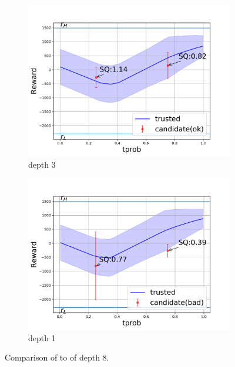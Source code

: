 \begin{figure}[tbp]
    \centering
    \begin{subfigure}[b]{0.5\linewidth}
        \centering
        \includegraphics[width=1.1\linewidth]{Figures/transition_vary_tprob_ok.pdf}
        \vfill
        \caption{\solve{} depth 3}
        \label{fig:tprob_ok}
    \end{subfigure}%
    \hfill
    \begin{subfigure}[b]{0.5\linewidth}
        \centering
        \includegraphics[width=1.1\linewidth]{Figures/transition_vary_tprob_bad.pdf}
        \caption{\solve{} depth 1}
        \label{fig:tprob_bad}
    \end{subfigure} 
    \caption{Comparison of \solve{} to \solvestar{} of depth 8.}
    \vspace{-0.5cm}
\end{figure}

